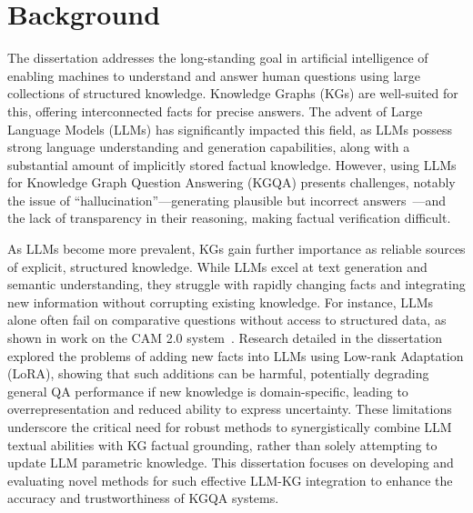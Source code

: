 \section*{Background}
\label{sec:synopsis:background}
The dissertation addresses the long-standing goal in artificial intelligence of enabling machines to understand and answer human questions using large collections of structured knowledge. Knowledge Graphs (KGs) are well-suited for this, offering interconnected facts for precise answers. The advent of Large Language Models (LLMs) has significantly impacted this field, as LLMs possess strong language understanding and generation capabilities, along with a substantial amount of implicitly stored factual knowledge. However, using LLMs for Knowledge Graph Question Answering (KGQA) presents challenges, notably the issue of ``hallucination''---generating plausible but incorrect answers~\cite{lin-etal-2022-truthfulqa, DBLP:conf/emnlp/RobertsRS20, DBLP:journals/csur/JiLFYSXIBMF23, DBLP:journals/corr/abs-2401-01313}---and the lack of transparency in their reasoning, making factual verification difficult.

As LLMs become more prevalent, KGs gain further importance as reliable sources of explicit, structured knowledge. While LLMs excel at text generation and semantic understanding, they struggle with rapidly changing facts and integrating new information without corrupting existing knowledge. For instance, LLMs alone often fail on comparative questions without access to structured data, as shown in work on the CAM 2.0 system~\cite{DBLP:conf/coling/ShalloufHSVMPBN24}. Research detailed in the dissertation~\cite{pletenev-etal-2025-much} explored the problems of adding new facts into LLMs using Low-rank Adaptation (LoRA), showing that such additions can be harmful, potentially degrading general QA performance if new knowledge is domain-specific, leading to overrepresentation and reduced ability to express uncertainty. These limitations underscore the critical need for robust methods to synergistically combine LLM textual abilities with KG factual grounding, rather than solely attempting to update LLM parametric knowledge. This dissertation focuses on developing and evaluating novel methods for such effective LLM-KG integration to enhance the accuracy and trustworthiness of KGQA systems.

